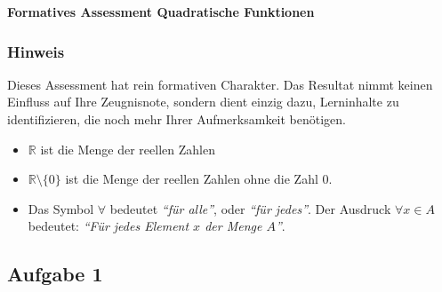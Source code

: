 \documentclass[12pt]{article}
\begin{document}
\begin{center}
\Large \textbf{Formatives Assessment Quadratische Funktionen}\\[1em]
\footnotesize
\end{center}
{\footnotesize
\subsubsection*{Hinweis}
Dieses Assessment hat rein formativen Charakter. Das Resultat nimmt keinen Einfluss auf Ihre Zeugnisnote, sondern dient einzig dazu, Lerninhalte zu identifizieren, die noch mehr Ihrer Aufmerksamkeit benötigen.
\begin{itemize}
\item $\mathbb{R}$ ist die Menge der reellen Zahlen
\item $\mathbb{R} \setminus \{0\}$ ist die Menge der reellen Zahlen ohne die Zahl $0$.
\item Das Symbol $\forall$ bedeutet \emph{``für alle''}, oder \emph{``für jedes''}. Der Ausdruck $\forall x \in A$ bedeutet: \emph{``Für jedes Element $x$ der Menge $A$''}.
\end{itemize}
}
\subsection*{Aufgabe 1}
\end{document}
